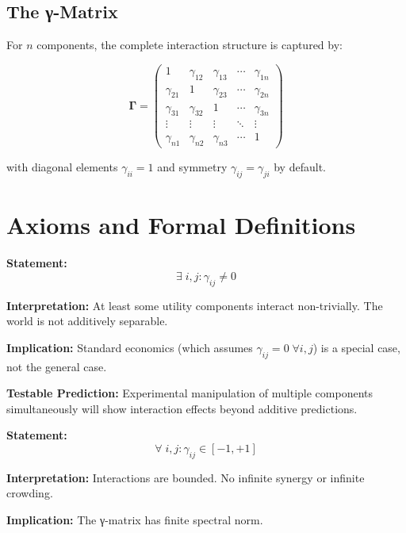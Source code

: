 \subsection{The γ-Matrix}

For $n$ components, the complete interaction structure is captured by:

\begin{equation}
\mathbf{\Gamma} = \begin{pmatrix}
1 & \gamma_{12} & \gamma_{13} & \cdots & \gamma_{1n} \\
\gamma_{21} & 1 & \gamma_{23} & \cdots & \gamma_{2n} \\
\gamma_{31} & \gamma_{32} & 1 & \cdots & \gamma_{3n} \\
\vdots & \vdots & \vdots & \ddots & \vdots \\
\gamma_{n1} & \gamma_{n2} & \gamma_{n3} & \cdots & 1
\end{pmatrix}
\label{eq:how-gamma-matrix}
\end{equation}

with diagonal elements $\gamma_{ii} = 1$ and symmetry $\gamma_{ij} = \gamma_{ji}$ by default.


\section{Axioms and Formal Definitions}
\label{sec:how-axioms}

\begin{tcolorbox}[colback=gray!5!white, colframe=gray!75!black,
    title=Axiom CMP-1: Existence of Interaction]
\textbf{Statement:}
\begin{equation}
\exists \; i, j: \gamma_{ij} \neq 0
\end{equation}

\textbf{Interpretation:} At least some utility components interact non-trivially.
The world is not additively separable.

\textbf{Implication:} Standard economics (which assumes $\gamma_{ij} = 0 \; \forall i,j$)
is a special case, not the general case.

\textbf{Testable Prediction:} Experimental manipulation of multiple components
simultaneously will show interaction effects beyond additive predictions.
\end{tcolorbox}

\begin{tcolorbox}[colback=gray!5!white, colframe=gray!75!black,
    title=Axiom CMP-2: Boundedness]
\textbf{Statement:}
\begin{equation}
\forall \; i, j: \gamma_{ij} \in [-1, +1]
\end{equation}

\textbf{Interpretation:} Interactions are bounded. No infinite synergy or infinite crowding.

\textbf{Implication:} The γ-matrix has finite spectral norm.
\end{tcolorbox}

